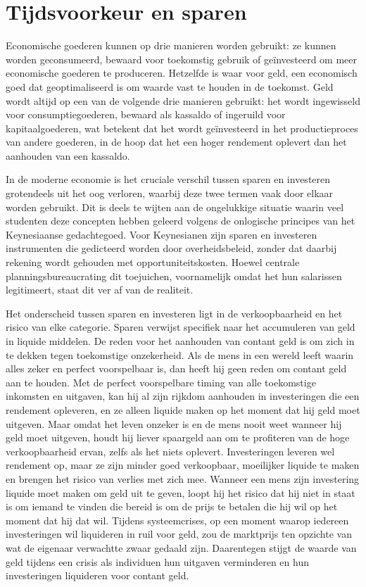 \documentclass[
  a5paper,
  smalldemyvopaper,11pt,twoside,onecolumn,openright,extrafontsizes,
hidelinks]{memoir}
\begin{document}
\section{Tijdsvoorkeur en sparen}\label{tijdsvoorkeur-en-sparen}

Economische goederen kunnen op drie manieren worden gebruikt: ze kunnen
worden geconsumeerd, bewaard voor toekomstig gebruik of geïnvesteerd om
meer economische goederen te produceren. Hetzelfde is waar voor geld,
een economisch goed dat geoptimaliseerd is om waarde vast te houden in
de toekomst. Geld wordt altijd op een van de volgende drie manieren
gebruikt: het wordt ingewisseld voor consumptiegoederen, bewaard als
kassaldo of ingeruild voor kapitaalgoederen, wat betekent dat het wordt
geïnvesteerd in het productieproces van andere goederen, in de hoop dat
het een hoger rendement oplevert dan het aanhouden van een kassaldo.

In de moderne economie is het cruciale verschil tussen sparen en
investeren grotendeels uit het oog verloren, waarbij deze twee termen
vaak door elkaar worden gebruikt. Dit is deels te wijten aan de
ongelukkige situatie waarin veel studenten deze concepten hebben geleerd
volgens de onlogische principes van het Keynesiaanse gedachtegoed. Voor
Keynesianen zijn sparen en investeren instrumenten die gedicteerd worden
door overheidsbeleid, zonder dat daarbij rekening wordt gehouden met
opportuniteitskosten. Hoewel centrale planningsbureaucrating dit
toejuichen, voornamelijk omdat het hun salarissen legitimeert, staat dit
ver af van de realiteit.

Het onderscheid tussen sparen en investeren ligt in de verkoopbaarheid
en het risico van elke categorie. Sparen verwijst specifiek naar het
accumuleren van geld in liquide middelen. De reden voor het aanhouden
van contant geld is om zich in te dekken tegen toekomstige onzekerheid.
Als de mens in een wereld leeft waarin alles zeker en perfect
voorspelbaar is, dan heeft hij geen reden om contant geld aan te houden.
Met de perfect voorspelbare timing van alle toekomstige inkomsten en
uitgaven, kan hij al zijn rijkdom aanhouden in investeringen die een
rendement opleveren, en ze alleen liquide maken op het moment dat hij
geld moet uitgeven. Maar omdat het leven onzeker is en de mens nooit
weet wanneer hij geld moet uitgeven, houdt hij liever spaargeld aan om
te profiteren van de hoge verkoopbaarheid ervan, zelfs als het niets
oplevert. Investeringen leveren wel rendement op, maar ze zijn minder
goed verkoopbaar, moeilijker liquide te maken en brengen het risico van
verlies met zich mee. Wanneer een mens zijn investering liquide moet
maken om geld uit te geven, loopt hij het risico dat hij niet in staat
is om iemand te vinden die bereid is om de prijs te betalen die hij wil
op het moment dat hij dat wil. Tijdens systeemcrises, op een moment
waarop iedereen investeringen wil liquideren in ruil voor geld, zou de
marktprijs ten opzichte van wat de eigenaar verwachtte zwaar gedaald
zijn. Daarentegen stijgt de waarde van geld tijdens een crisis als
individuen hun uitgaven verminderen en hun investeringen liquideren voor
contant geld.
\end{document}
